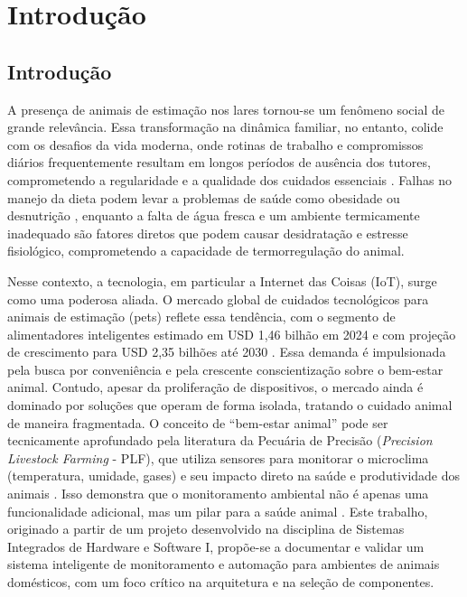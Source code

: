 

\chapter{Introdução}

\section{Introdução}
A presença de animais de estimação nos lares tornou-se um fenômeno social de grande relevância.
Essa transformação na dinâmica familiar, no entanto, colide com os desafios da vida moderna, onde rotinas de trabalho e compromissos diários frequentemente resultam em longos períodos de ausência dos tutores, comprometendo a regularidade e a qualidade dos cuidados essenciais \cite{rodrigues2019}.
Falhas no manejo da dieta podem levar a problemas de saúde como obesidade ou desnutrição \cite{alves2020}, enquanto a falta de água fresca e um ambiente termicamente inadequado são fatores diretos que podem causar desidratação e estresse fisiológico, comprometendo a capacidade de termorregulação do animal.


Nesse contexto, a tecnologia, em particular a Internet das Coisas (IoT), surge como uma poderosa aliada.
O mercado global de cuidados tecnológicos para animais de estimação (pets) reflete essa tendência, com o segmento de alimentadores inteligentes estimado em USD 1,46 bilhão em 2024 e com projeção de crescimento para USD 2,35 bilhões até 2030 \cite{grandview2024}.
Essa demanda é impulsionada pela busca por conveniência e pela crescente conscientização sobre o bem-estar animal.
Contudo, apesar da proliferação de dispositivos, o mercado ainda é dominado por soluções que operam de forma isolada, tratando o cuidado animal de maneira fragmentada.
O conceito de ``bem-estar animal'' pode ser tecnicamente aprofundado pela literatura da Pecuária de Precisão (\textit{Precision Livestock Farming} - PLF), que utiliza sensores para monitorar o microclima (temperatura, umidade, gases) e seu impacto direto na saúde e produtividade dos animais \cite{tavares2021, neethirajan2017}.
Isso demonstra que o monitoramento ambiental não é apenas uma funcionalidade adicional, mas um pilar para a saúde animal \cite{mdpiAnimals2024}.
Este trabalho, originado a partir de um projeto desenvolvido na disciplina de Sistemas Integrados de Hardware e Software I, propõe-se a documentar e validar um sistema inteligente de monitoramento e automação para ambientes de animais domésticos, com um foco crítico na arquitetura e na seleção de componentes.
